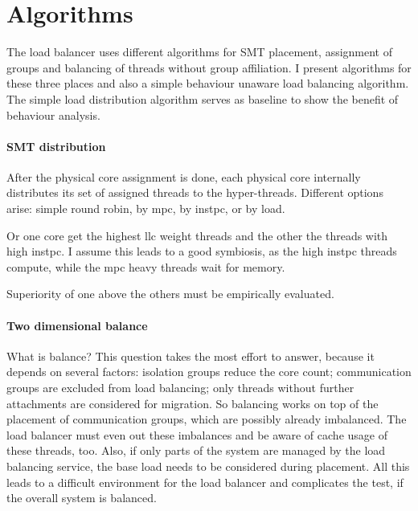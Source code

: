 \section{Algorithms}
\label{impl:algos}


The load balancer uses different algorithms for SMT placement, assignment of
groups and balancing of threads without group affiliation.
I present algorithms for these three places and also a simple behaviour unaware
load balancing algorithm.
The simple load distribution algorithm serves as baseline to show the benefit of
behaviour analysis.

\paragraph{SMT distribution}
After the physical core assignment is done, each physical core internally
distributes its set of assigned threads to the hyper-threads.
Different options arise: simple round robin, by \gls{mpc}, by \gls{instpc}, or
by load.

Or one core get the highest \gls{llc} weight threads and the other the threads
with high \gls{instpc}.
I assume this leads to a good symbiosis, as the high \gls{instpc} threads compute,
while the \gls{mpc} heavy threads wait for memory.

Superiority of one above the others must be empirically evaluated.


\paragraph{Two dimensional balance}
What is balance? This question takes the most effort to answer, because it
depends on several factors: isolation groups reduce the core count;
communication groups are excluded from load balancing;
only threads without further attachments are considered for migration.
So balancing works on top of the placement of communication groups, which are
possibly already imbalanced.
The load balancer must even out these imbalances and be aware of cache usage of
these threads, too.
Also, if only parts of the system are managed by the load balancing service,
the base load needs to be considered during placement.
All this leads to a difficult environment for the load balancer and complicates
the test, if the overall system is balanced.


